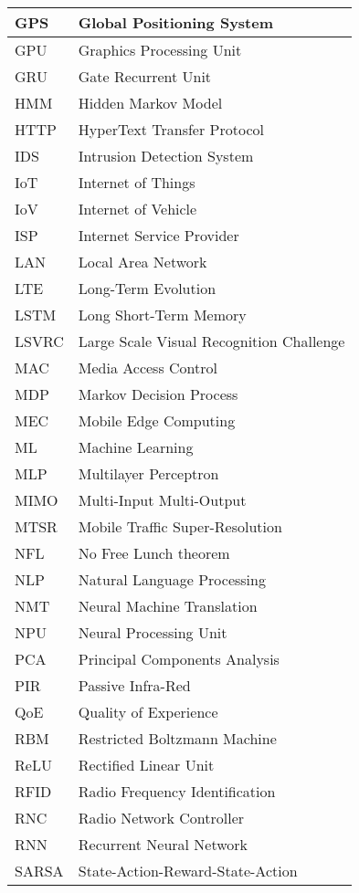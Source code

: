 \documentclass[journal,comsoc,letter]{IEEEtran}
\begin{document}
\begin{table}[htpb!]
\begin{tabular}{|C{2.1cm}||C{5.7cm}|}
GPS & Global Positioning System \\\hline
GPU & Graphics Processing Unit \\\hline
GRU & Gate Recurrent Unit \\\hline
HMM & Hidden Markov Model \\\hline
HTTP & HyperText Transfer Protocol \\\hline 
IDS & Intrusion Detection System \\\hline 
IoT & Internet of Things \\\hline
IoV & Internet of Vehicle \\\hline
ISP & Internet Service Provider \\\hline 
LAN & Local Area Network \\\hline
LTE & Long-Term Evolution \\\hline 
LSTM & Long Short-Term Memory \\\hline
LSVRC & Large Scale Visual Recognition Challenge\\\hline
MAC & Media Access Control \\\hline
MDP &Markov Decision Process \\\hline
MEC & Mobile Edge Computing  \\\hline
ML & Machine Learning \\\hline
MLP & Multilayer Perceptron \\\hline
MIMO & Multi-Input Multi-Output \\\hline
MTSR & Mobile Traffic Super-Resolution \\\hline
NFL & No Free Lunch theorem \\\hline
NLP & Natural Language Processing \\\hline
NMT & Neural Machine Translation \\\hline
NPU & Neural Processing Unit \\\hline
PCA & Principal Components Analysis \\\hline
PIR & Passive Infra-Red \\\hline
QoE & Quality of Experience \\\hline
RBM & Restricted Boltzmann Machine\\ \hline
ReLU & Rectified Linear Unit\\ \hline
RFID & Radio Frequency Identification \\ \hline
RNC & Radio Network Controller \\ \hline
RNN & Recurrent Neural Network\\ \hline
SARSA & State-Action-Reward-State-Action\\ \hline

\end{tabular}
\end{table}
\end{document}

